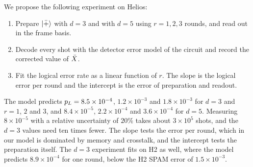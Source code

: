 We propose the following experiment on Helios:
\begin{enumerate}
  \item Prepare $\left|\bar{+}\right\rangle$ with $d=3$ and with $d=5$ using $r=1,2,3$ rounds, and read out in the frame basis.
  \item Decode every shot with the detector error model of the circuit and record the corrected value of $\bar{X}$.
  \item Fit the logical error rate as a linear function of $r$. The slope is the logical error per round and the intercept is the error of preparation and readout.
\end{enumerate}
The model predicts $p_L=8.5\times10^{-4}$, $1.2\times10^{-3}$ and $1.8\times10^{-3}$ for $d=3$ and $r=1$, $2$ and $3$, and $8.4\times10^{-5}$, $2.2\times10^{-4}$ and $3.6\times10^{-4}$ for $d=5$. Measuring $8\times10^{-5}$ with a relative uncertainty of $20\%$ takes about $3\times10^{5}$ shots, and the $d=3$ values need ten times fewer. The slope tests the error per round, which in our model is dominated by memory and crosstalk, and the intercept tests the preparation itself. The $d=3$ experiment fits on H2 as well, where the model predicts $8.9\times10^{-4}$ for one round, below the H2 SPAM error of $1.5\times10^{-3}$.
